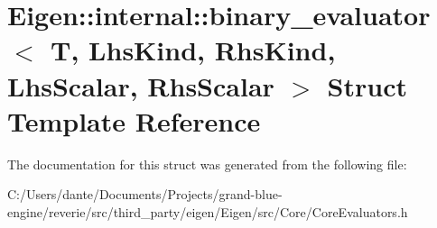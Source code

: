 \hypertarget{struct_eigen_1_1internal_1_1binary__evaluator}{}\section{Eigen\+::internal\+::binary\+\_\+evaluator$<$ T, Lhs\+Kind, Rhs\+Kind, Lhs\+Scalar, Rhs\+Scalar $>$ Struct Template Reference}
\label{struct_eigen_1_1internal_1_1binary__evaluator}


The documentation for this struct was generated from the following file\+:\begin{DoxyCompactItemize}
\item 
C\+:/\+Users/dante/\+Documents/\+Projects/grand-\/blue-\/engine/reverie/src/third\+\_\+party/eigen/\+Eigen/src/\+Core/Core\+Evaluators.\+h\end{DoxyCompactItemize}
